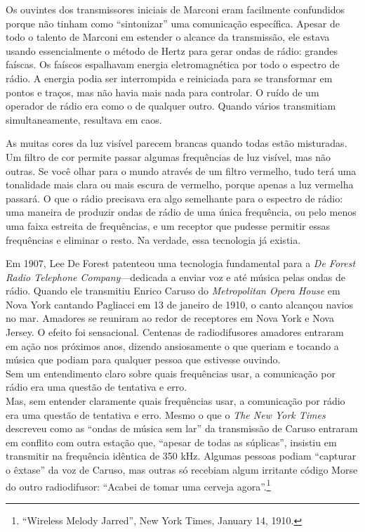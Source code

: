 \documentclass{book}
\newcommand{\ingles}[1]{\textit{#1}}
\begin{document}
Os ouvintes dos transmissores iniciais de Marconi eram facilmente confundidos
porque não tinham como ``sintonizar'' uma comunicação específica. Apesar de todo
o talento de Marconi em estender o alcance da transmissão, ele estava usando
essencialmente o método de Hertz para gerar ondas de rádio: grandes faíscas. Os
faíscos espalhavam energia eletromagnética por todo o espectro de rádio. A energia
podia ser interrompida e reiniciada para se transformar em pontos e traços, mas
não havia mais nada para controlar. O ruído de um operador de rádio era como o de
qualquer outro. Quando vários transmitiam simultaneamente, resultava em caos.

As muitas cores da luz visível parecem brancas quando todas estão misturadas. Um
filtro de cor permite passar algumas frequências de luz visível, mas não outras.
Se você olhar para o mundo através de um filtro vermelho, tudo terá uma tonalidade
mais clara ou mais escura de vermelho, porque apenas a luz vermelha passará. O
que o rádio precisava era algo semelhante para o espectro de rádio: uma maneira
de produzir ondas de rádio de uma única frequência, ou pelo menos uma faixa
estreita de frequências, e um receptor que pudesse permitir essas frequências e
eliminar o resto. Na verdade, essa tecnologia já existia.

Em 1907, Lee De Forest patenteou uma tecnologia fundamental para a \ingles{De
Forest Radio Telephone Company}---dedicada a enviar voz e até música pelas ondas
de rádio. Quando ele transmitiu Enrico Caruso do \ingles{Metropolitan Opera House}
em Nova York cantando Pagliacci em 13 de janeiro de 1910, o canto alcançou navios
no mar. Amadores se reuniram ao redor de receptores em Nova York e Nova Jersey.
O efeito foi sensacional. Centenas de radiodifusores amadores entraram em ação
nos próximos anos, dizendo ansiosamente o que queriam e tocando a música que
podiam para qualquer pessoa que estivesse ouvindo.\\

Sem um entendimento claro sobre quais frequências usar, a comunicação por rádio
era uma questão de tentativa e erro.\\

Mas, sem entender claramente quais frequências usar, a comunicação por rádio era
uma questão de tentativa e erro. Mesmo o que o \ingles{The New York Times} descreveu
como as ``ondas de música sem lar'' da transmissão de Caruso entraram em conflito
com outra estação que, ``apesar de todas as súplicas'', insistiu em transmitir na
frequência idêntica de 350 kHz. Algumas pessoas podiam ``capturar o êxtase'' da
voz de Caruso, mas outras só recebiam algum irritante código Morse do outro
radiodifusor: ``Acabei de tomar uma cerveja agora''.\footnote{``Wireless Melody
Jarred'', New York Times, January 14, 1910.}
\end{document}
